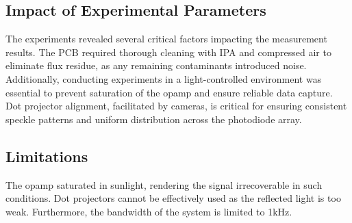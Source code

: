 \subsection{Impact of Experimental Parameters}

The experiments revealed several critical factors impacting the measurement results. 
The PCB required thorough cleaning with IPA and compressed air to eliminate flux residue, as any remaining contaminants introduced noise. 
Additionally, conducting experiments in a light-controlled environment was essential to prevent saturation of the opamp and ensure reliable data capture. 
Dot projector alignment, facilitated by cameras, is critical for ensuring consistent speckle patterns and uniform distribution across the photodiode array.

\subsection{Limitations}
The opamp saturated in sunlight, rendering the signal irrecoverable in such conditions. Dot projectors cannot be effectively used as the reflected light is too weak.
Furthermore, the bandwidth of the system is limited to 1kHz.
